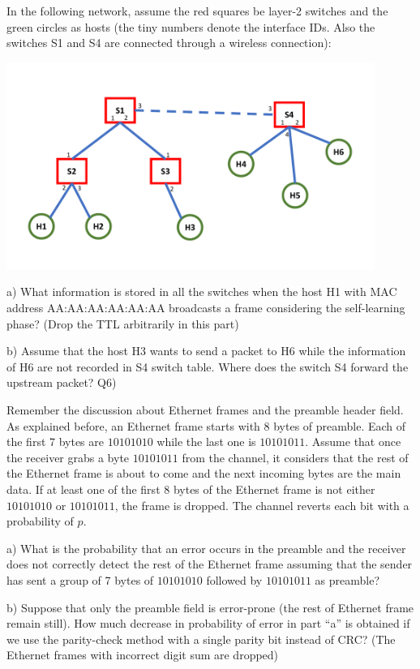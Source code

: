 \documentclass[10pt,letterpaper]{article}
\begin{document}
In the following network, assume the red squares be layer-2 switches and the green circles as hosts (the tiny numbers denote the interface IDs. Also the switches S1 and S4 are connected through a wireless connection):
\begin{center}
\includegraphics[width=120mm]{Q5_HW8}
\end{center}
a) What information is stored in all the switches when the host H1 with MAC address AA:AA:AA:AA:AA:AA broadcasts a frame considering the self-learning phase? (Drop the TTL arbitrarily in this part)

b) Assume that the host H3 wants to send a packet to H6 while the information of H6 are not recorded in S4 switch table. Where does the switch S4 forward the upstream packet?
\newline\newline
Q6)

Remember the discussion about Ethernet frames and the preamble header field. As explained before, an Ethernet frame starts with 8 bytes of preamble. Each of the first 7 bytes are $10101010$ while the last one is $10101011$. Assume that once the receiver grabs a byte $10101011$ from the channel, it considers that the rest of the Ethernet frame is about to come and the next incoming bytes are the main data. If at least one of the first 8 bytes of the Ethernet frame is not either $10101010$ or $10101011$, the frame is dropped. The channel reverts each bit with a probability of $p$.

a) What is the probability that an error occurs in the preamble and the receiver does not correctly detect the rest of the Ethernet frame assuming that the sender has sent a group of 7 bytes of $10101010$ followed by $10101011$ as preamble?

b) Suppose that only the preamble field is error-prone (the rest of Ethernet frame remain still). How much decrease in probability of error in part ``a'' is obtained if we use the parity-check method with a single parity bit instead of CRC? (The Ethernet frames with incorrect digit sum are dropped)
\end{document}
